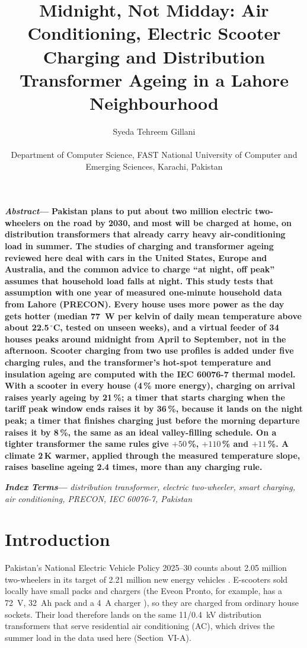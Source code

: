 \documentclass[conference]{IEEEtran}
\makeatletter
\newcommand{\IEEEauthorblockN}[1]{{\large #1}\\}
\newcommand{\IEEEauthorblockA}[1]{\normalsize\itshape\begin{tabular}{@{}c@{}}#1\end{tabular}}
\newenvironment{IEEEkeywords}{\par\noindent\textbf{\textit{Index Terms}---}\itshape}{\par}
\renewenvironment{abstract}{\par\noindent\textbf{\textit{Abstract}---}\bfseries}{\par\medskip}
\makeatother
\begin{document}
\title{Midnight, Not Midday: Air Conditioning, Electric Scooter Charging and Distribution Transformer Ageing in a Lahore Neighbourhood}

\author{\IEEEauthorblockN{Syeda Tehreem Gillani}
\IEEEauthorblockA{Department of Computer Science, FAST National University of Computer and Emerging Sciences, Karachi, Pakistan}}

\maketitle

\begin{abstract}
Pakistan plans to put about two million electric two-wheelers on the road by
2030, and most will be charged at home, on distribution transformers that
already carry heavy air-conditioning load in summer. The studies of charging and
transformer ageing reviewed here deal with cars in the United States, Europe
and Australia, and the common advice to charge ``at night, off peak'' assumes
that household load falls at night. This study tests that assumption with one
year of measured one-minute household data from Lahore (PRECON). Every house
uses more power as the day gets hotter (median 77~W per kelvin of daily mean
temperature above about 22.5\,$^\circ$C, tested on unseen weeks), and a
virtual feeder of 34 houses peaks around midnight from April to September, not
in the afternoon. Scooter charging from two use profiles is added under five
charging rules, and the transformer's hot-spot temperature and insulation
ageing are computed with the IEC 60076-7 thermal model. With a scooter in
every house (4\,\% more energy), charging on arrival raises yearly ageing by
21\,\%; a timer that starts charging when the tariff peak window ends raises
it by 36\,\%, because it lands on the night peak; a timer that finishes
charging just before the morning departure raises it by 8\,\%, the same as an
ideal valley-filling schedule. On a tighter transformer the same rules give
$+50$\,\%, $+110$\,\% and $+11$\,\%. A climate 2\,K warmer, applied through the
measured temperature slope, raises baseline ageing 2.4 times, more than any
charging rule.
\end{abstract}

\begin{IEEEkeywords}
distribution transformer, electric two-wheeler, smart charging, air conditioning, PRECON, IEC 60076-7, Pakistan
\end{IEEEkeywords}

\section{Introduction}
Pakistan's National Electric Vehicle Policy 2025--30 counts about 2.05 million
two-wheelers in its target of 2.21 million new energy vehicles \cite{saarc2026}.
E-scooters sold locally have small packs and chargers (the Eveon Pronto, for
example, has a 72~V, 32~Ah pack and a 4~A charger \cite{pronto}), so they are
charged from ordinary house sockets. Their load therefore lands on the same
11/0.4~kV distribution transformers that serve residential air conditioning
(AC), which drives the summer load in the data used here (Section~VI-A).
\end{document}
